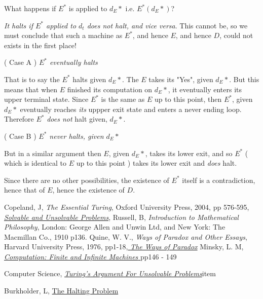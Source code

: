 \documentclass{article}[12pt]
\begin{document}
\noindent 

What happens if $E^*$ is applied to $d_E*$ i.e. $E^*(d_E*)$?

\noindent

\emph{It halts if $E^*$ applied to $d_t$ does not halt, and vice versa}. This cannot be, so we must conclude that such a machine as $E^*$, and hence $E$, and hence $D$, could not exists in the first place!

\noindent

( Case A ) \emph{$E^*$ eventually halts}

\noindent

That is to say the $E^*$ halts given  $d_E*$. The $E$ takes its "Yes", given $d_E*$. But this means that when $E$ finished its computation on $d_E*$, it eventually enters its upper terminal state. Since $E^*$ is the same as $E$ up to this point, then $E^*$, given $d_E*$ eventually reaches \emph{its} uppper exit state and enters a never ending loop. Therefore  $E^*$ \emph{does not} halt given,  $d_E*$.


\noindent

( Case B ) \emph{$E^*$ never halts, given $d_E*$}

\noindent

But in a similar argument then $E$, given $d_E*$, takes its lower exit, and so $E^*$ ( which is identical to $E$ up to this point ) takes its lower exit and \emph{does} halt.


\noindent

Since there are no other possibilities, the existence of $E^*$ itself is a contradiction, hence that of $E$, hence the existence of $D$.



\begin{thebibliography}{10}

Copeland, J, \emph{The Essential Turing}, Oxford University Press, 2004, pp 576-595, \href{https://www.ivanociardelli.altervista.org/wp-content/uploads/2018/04/Solvable-and-unsolvable-problems.pdf}{ \emph{Solvable and Unsolvable Problems}},  
Russell, B, \emph{Introduction to Mathematical Philosophy}, London: George Allen and Unwin Ltd, and New York: The Macmillan Co., 1910 p136.
 Quine, W. V., \emph{Ways of Paradox and Other Essays}, Harvard University Press, 1976, pp1-18,\href{http://www.thatmarcusfamily.org/philosophy/Course_Websites/Readings/Quine%20-%20Ways%20of%20Paradox.pdf}{ \emph{The Ways of Paradox}}
 Minsky, L. M,  \href{https://archive.org/details/computationfinit0000mins/page/n5/mode/2up}{ \emph{Computation: Finite and Infinite Machines }} pp146 - 149

 Computer Science, \href{https://cs.stackexchange.com/questions/169803/turings-argument-for-unsolvable-problems}{\emph{Turing's Argument For Unsolvable Problems}}item

 Burkholder, L, \href{https://dl.acm.org/doi/pdf/10.1145/24658.24665}{The Halting Problem}

\end{thebibliography}
\end{document}
